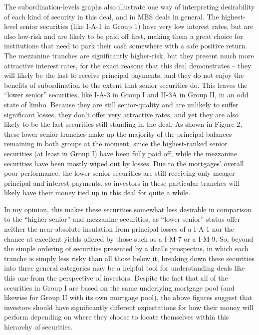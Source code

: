 \documentclass[12pt]{article}
\begin{document}
The subordination-levels graphs also illustrate one way of interpreting desirability of each kind of security in this deal, and in MBS deals in general. The highest-level senior securities (like I-A-1 in Group 1) have very low interest rates, but are also low-risk and are likely to be paid off first, making them a great choice for institutions that need to park their cash somewhere with a safe positive return. The mezzanine tranches are significantly higher-risk, but they present much more attractive interest rates, for the exact reasons that this deal demonstrates – they will likely be the last to receive principal payments, and they do not enjoy the benefits of subordination to the extent that senior securities do. This leaves the “lower senior” securities, like I-A-3 in Group I and II-3A in Group II, in an odd state of limbo. Because they are still senior-quality and are unlikely to suffer significant losses, they don’t offer very attractive rates, and yet they are also likely to be the last securities still standing in the deal. As shown in Figure 2, these lower senior tranches make up the majority of the principal balances remaining in both groups at the moment, since the highest-ranked senior securities (at least in Group I) have been fully paid off, while the mezzanine securities have been mostly wiped out by losses. Due to the mortgages’ overall poor performance, the lower senior securities are still receiving only meager principal and interest payments, so investors in these particular tranches will likely have their money tied up in this deal for quite a while.

In my opinion, this makes these securities somewhat less desirable in comparison to the ``higher senior'' and mezzanine securities, as “lower senior” status offer neither the near-absolute insulation from principal losses of a I-A-1 nor the chance at excellent yields offered by those such as a I-M-7 or a I-M-9. So, beyond the simple ordering of securities presented by a deal’s prospectus, in which each tranche is simply less risky than all those below it, breaking down these securities into three general categories may be a helpful tool for understanding deals like this one from the perspective of investors. Despite the fact that all of the securities in Group I are based on the same underlying mortgage pool (and likewise for Group II with its own mortgage pool), the above figures suggest that investors should have significantly different expectations for how their money will perform depending on where they choose to locate themselves within this hierarchy of securities.
\end{document}
